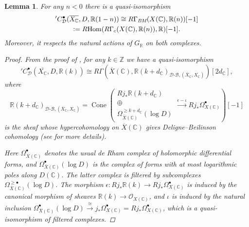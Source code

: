\documentclass[10pt,a4paper,oneside]{article}
\DeclareMathOperator{\Cone}{Cone}
\DeclareMathOperator{\Hom}{Hom}
\newcommand{\CC}{\mathbb{C}}
\newcommand{\RR}{\mathbb{R}}
\newcommand{\ZZ}{\mathbb{Z}}
\newcommand{\BM}{\text{\it BM}}
\newcommand{\DB}{{\mathcal{D}\text{-}\mathcal{B}}}
\newcommand{\dfn}{\mathrel{\mathop:}=}
\newcommand{\RHom}{R\!\Hom}
\theoremstyle{myplain}
\newtheorem{lemma}[theorem]{Lemma}
\theoremstyle{mydefinition}
\numberwithin{equation}{section}
\begin{document}
\begin{lemma}
  For any $n < 0$ there is a quasi-isomorphism
  \begin{multline*}
    {}' C^\bullet_\mathcal{D} (\overline{X_\CC}, D, \RR (1-n)) \cong
    R\Gamma_\BM (X (\CC), \RR (n)) [-1] \\
    \dfn \RHom (R\Gamma_c (X (\CC), \RR (n)), \RR) [-1].
  \end{multline*}
  Moreover, it respects the natural actions of $G_\RR$ on both complexes.

  \begin{proof}
    From the proof of \cite[Theorem~1.15]{Jannsen-1988}, for any $k \in \ZZ$ we
    have a quasi-isomorphism
    \begin{equation}
      \label{eqn:Jannsen-Theorem-1.15}
      {}' C^\bullet_\mathcal{D} (\overline{X_\CC}, D, \RR (k)) \cong
      R\Gamma (\overline{X} (\CC), \RR (k + d_\CC)_{\DB, (\overline{X}_\CC,X_\CC)}) [2d_\CC],
    \end{equation}
    where
    \[ \RR (k + d_\CC)_{\DB, (\overline{X}_\CC,X_\CC)} =
      \Cone \left(\begin{array}{c}
        R j_* \RR (k + d_\CC) \\
        \oplus \\
        \Omega^{\geqslant k + d_\CC}_{\overline{X} (\CC)} (\log D)
      \end{array}
      \xrightarrow{\epsilon - \iota}
      R j_* \Omega_{X (\CC)}^\bullet \right) [-1] \]
    is the sheaf whose hypercohomology on $\overline{X} (\CC)$ gives
    Deligne--Beilinson cohomology (see \cite{Esnault-Viehweg-1988} for
    more details).

    Here $\Omega^\bullet_{\overline{X} (\CC)}$ denotes the usual de Rham complex
    of holomorphic differential forms, and
    $\Omega^\bullet_{\overline{X} (\CC)} (\log D)$ is the complex of forms with
    at most logarithmic poles along $D (\CC)$.
    The latter complex is filtered by subcomplexes
    $\Omega^{\geqslant \bullet}_{\overline{X} (\CC)} (\log D)$.
    The morphism
    $\epsilon\colon R j_* \RR (k) \to R j_* \Omega^\bullet_{X (\CC)}$ is induced
    by the canonical morphism of sheaves $\RR (k) \to \mathcal{O}_{X (\CC)}$,
    and $\iota$ is induced by the natural inclusion
    $\Omega^\bullet_{\overline{X} (\CC)} (\log D) \xrightarrow{\cong} j_*
    \Omega_{X (\CC)}^\bullet = R j_* \Omega_{X (\CC)}^\bullet$, which is a
    quasi-isomorphism of filtered complexes.


\end{proof}
\end{lemma}
\end{document}
